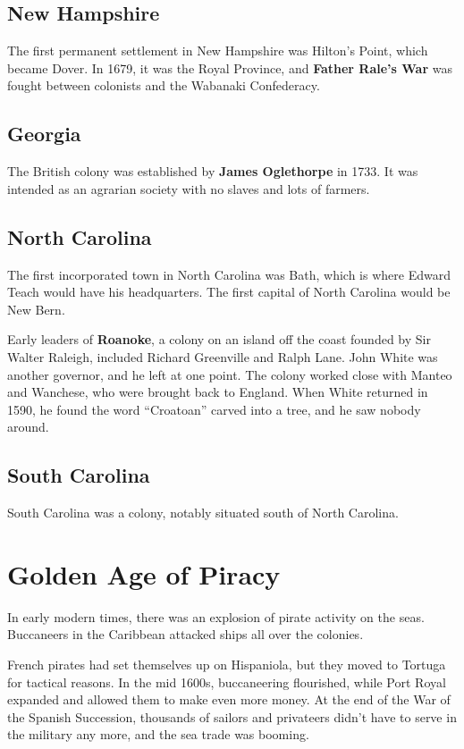 \subsection*{New Hampshire}

The first permanent settlement in New Hampshire was Hilton's Point, which became Dover.
In 1679, it was the Royal Province,
and \textbf{Father Rale's War} was fought between colonists and the Wabanaki Confederacy.

\subsection*{Georgia}

The British colony was established by \textbf{James Oglethorpe} in 1733.
It was intended as an agrarian society with no slaves and lots of farmers.

\subsection*{North Carolina}

The first incorporated town in North Carolina was Bath, which is where Edward Teach would have his headquarters.
The first capital of North Carolina would be New Bern.

Early leaders of \textbf{Roanoke}, a colony on an island off the coast founded by Sir Walter Raleigh,
included Richard Greenville and Ralph Lane.
John White was another governor, and he left at one point.
The colony worked close with Manteo and Wanchese, who were brought back to England.
When White returned in 1590, he found the word ``Croatoan'' carved into a tree,
and he saw nobody around.

\subsection*{South Carolina}

South Carolina was a colony, notably situated south of North Carolina.

\section{Golden Age of Piracy}

In early modern times, there was an explosion of pirate activity on the seas.
Buccaneers in the Caribbean attacked ships all over the colonies.

French pirates had set themselves up on Hispaniola,
but they moved to Tortuga for tactical reasons.
In the mid 1600s, buccaneering flourished,
while Port Royal expanded and allowed them to make even more money.
At the end of the War of the Spanish Succession,
thousands of sailors and privateers didn't have to serve in the military any more, and the sea trade was booming.

